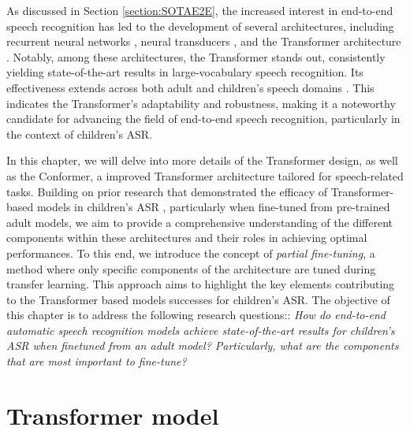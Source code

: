 As discussed in Section \ref{section:SOTAE2E}, the increased interest in end-to-end speech recognition has led to the development of several architectures, including recurrent neural networks \cite{soltau2016neural}, neural transducers \cite{battenberg2017exploring}, and the Transformer architecture \cite{vaswani2017attention}. Notably, among these architectures, the Transformer stands out, consistently yielding state-of-the-art results in large-vocabulary speech recognition. Its effectiveness extends across both adult and children's speech domains \cite{gelin2021endtoend}. This indicates the Transformer's adaptability and robustness, making it a noteworthy candidate for advancing the field of end-to-end speech recognition, particularly in the context of children's ASR.


In this chapter, we will delve into more details of the Transformer design, as well as the Conformer, a improved Transformer architecture tailored for speech-related tasks. Building on prior research that demonstrated the efficacy of Transformer-based models in children's ASR \cite{gelin2021endtoend}, particularly when fine-tuned from pre-trained adult models, we aim to provide a comprehensive understanding of the different components within these architectures and their roles in achieving optimal performances. To this end, we introduce the concept of \textit{partial fine-tuning}, a method where only specific components of the architecture are tuned during transfer learning. This approach aims to highlight the key elements contributing to the Transformer based models successes for children's ASR. The objective of this chapter is to address the following research questions:: \textit{How do end-to-end automatic speech recognition models achieve state-of-the-art results for children's ASR when finetuned from an adult model?  Particularly, what are the components that are most important to fine-tune?}
\section{Transformer model}
\label{sec:trans_archi}

